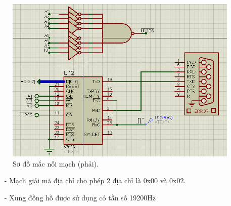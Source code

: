 \documentclass[../report.tex]{subfiles}
\begin{document}
\begin{figure}[H]
\centering
\includegraphics[width=\textwidth]{figures/diagram-right.png}
\caption{Sơ đồ mắc nối mạch (phải).}
\end{figure}

\begin{itemize}
\item[-] Mạch giải mã địa chỉ cho phép 2 địa chỉ là 0x00 và 0x02. \\
\item[-] Xung đồng hồ được sử dụng có tần số 19200Hz
\end{itemize}
\end{document}
